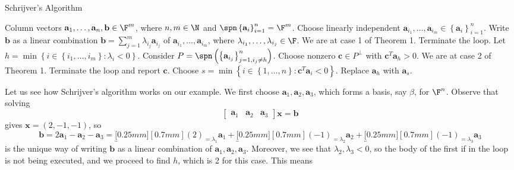 \documentclass{article}
\renewcommand{\underbrace}{\underbracket[0.25mm][0.7mm]}
\renewcommand{\vec}{\mathbf}
\begin{document}
\begin{algorithm}[]
   \caption{Schrijver's Algorithm}
   \label{alg:Schrijver}
\begin{algorithmic}
     Column vectors $\vec{a}_1,\ldots,\vec{a}_n,\vec{b}\in\F^m$, where $n,m\in\N$ and $\spn\left\lbrace \vec{a}_i \right\rbrace ^{n}_{i=1}=\F^m$.
    \STATE Choose linearly independent $\vec{a}_{i_1},\ldots,\vec{a}_{i_m}\in\left\lbrace \vec{a}_i \right\rbrace ^{n}_{i=1}$.
    \REPEAT
    \STATE Write $\vec{b}$ as a linear combination $\vec{b} = \sum^{m}_{j=1} \lambda_{i_j}\vec{a}_{i_j}$ of $\vec{a}_{i_1},\ldots,\vec{a}_{i_m}$, where $\lambda_{i_1},\ldots,\lambda_{i_j}\in\F$.
    \STATE We are at case 1 of Theorem 1.
    \STATE Terminate the loop.
    \ENDIF
    \STATE Let $h = \min\left\lbrace i\in\left\lbrace i_1,\ldots,i_m \right\rbrace : \lambda_i<0 \right\rbrace$.
    \STATE Consider $P = \spn\left( \left\lbrace \vec{a}_{i_j} \right\rbrace^{n}_{j=1, i_j\neq h} \right)$.
    \STATE Choose nonzero $\vec{c}\in P^{\perp}$ with $\vec{c}^{T} \vec{a}_h > 0$.
    \IF{$\forall j\in\left\lbrace 1,\ldots,m \right\rbrace \left[ \vec{c}^{T} \vec{a}_{i_j}\geq 0 \right]$}
    \STATE We are at case 2 of Theorem 1.
    \STATE Terminate the loop and report $\vec{c}$.
    \ENDIF
    \STATE Choose $s = \min\left\lbrace i\in\left\lbrace 1,\ldots,n \right\rbrace : \vec{c}^{T} \vec{a}_i < 0 \right\rbrace$.
    \STATE Replace $\vec{a}_h$ with $\vec{a}_s$.
    \UNTIL{}
\end{algorithmic}
\end{algorithm}
Let us see how Schrijver's algorithm works on our example. We first choose $\vec{a}_1,\vec{a}_2,\vec{a}_3$, which forms a basis, say $\beta$, for $\F^n$. Observe that solving
\begin{equation*}
    \begin{bmatrix} \vec{a}_1&\vec{a}_2&\vec{a}_3 \end{bmatrix} \vec{x} = \vec{b}
\end{equation*}
gives $\vec{x} = \left( 2,-1,-1 \right)$, so
\begin{equation*}
    \vec{b} = 2\vec{a}_1-\vec{a}_2-\vec{a}_3 = \underbrace{\left( 2 \right) }_{=\lambda_1}\vec{a}_1+\underbrace{\left( -1 \right) }_{=\lambda_2}\vec{a}_2+\underbrace{\left( -1 \right) }_{=\lambda_3}\vec{a}_3
\end{equation*}
is the unique way of writing $\vec{b}$ as a linear combination of $\vec{a}_1,\vec{a}_2,\vec{a}_3$. Moreover, we see that $\lambda_2,\lambda_3<0$, so the body of the first if in the loop is not being executed, and we proceed to find $h$, which is 2 for this case. This means
\end{document}
